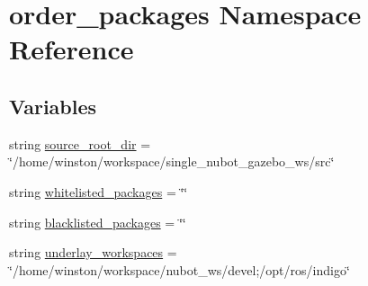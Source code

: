 \hypertarget{namespaceorder__packages}{\section{order\-\_\-packages Namespace Reference}
\label{namespaceorder__packages}
}
\subsection*{Variables}
\begin{DoxyCompactItemize}
\item 
string \hyperlink{namespaceorder__packages_aff4fd297841de7fbddc2c0c33a6bab21}{source\-\_\-root\-\_\-dir} = \char`\"{}/home/winston/workspace/single\-\_\-nubot\-\_\-gazebo\-\_\-ws/src\char`\"{}
\item 
string \hyperlink{namespaceorder__packages_a84450a73e77dbf3689293b97dcb697a4}{whitelisted\-\_\-packages} = \char`\"{}\char`\"{}
\item 
string \hyperlink{namespaceorder__packages_a29ea913f00c5a0e81d3c7688e7375507}{blacklisted\-\_\-packages} = \char`\"{}\char`\"{}
\item 
string \hyperlink{namespaceorder__packages_a11d102ff09fd2977b9075c4c722015d2}{underlay\-\_\-workspaces} = \char`\"{}/home/winston/workspace/nubot\-\_\-ws/devel;/opt/ros/indigo\char`\"{}
\end{DoxyCompactItemize}


